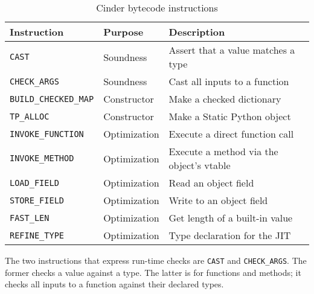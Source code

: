 \documentclass[english,cleveref,submission]{programming}
\newcommand{\SP}{Static Python}
\newcommand{\code}[1]{\texttt{#1}}
\newcommand{\bcinst}[1]{\code{#1}}
\begin{document}
\begin{table}
  \caption{Cinder bytecode instructions}
  \label{t:bytecode}

  \begin{tabular}{lll}
    {Instruction} & {Purpose} & {Description} \\\hline
    \bcinst{CAST} & Soundness & Assert that a value matches a type \\
    \bcinst{CHECK\_ARGS} & Soundness & Cast all inputs to a function \\[1ex]

    \bcinst{BUILD\_CHECKED\_MAP} & Constructor & Make a checked dictionary \\
    \bcinst{TP\_ALLOC} & Constructor & Make a \SP{} object \\[1ex]

    \bcinst{INVOKE\_FUNCTION} & Optimization & Execute a direct function call \\
    \bcinst{INVOKE\_METHOD} & Optimization & Execute a method via the object's vtable \\
    \bcinst{LOAD\_FIELD} & Optimization & Read an object field \\
    \bcinst{STORE\_FIELD} & Optimization & Write to an object field \\
    \bcinst{FAST\_LEN} & Optimization & Get length of a built-in value \\
    \bcinst{REFINE\_TYPE} & Optimization & Type declaration for the JIT \\


  \end{tabular}
\end{table}

The two instructions that express run-time checks are \code{CAST}
and \code{CHECK\_ARGS}.
The former checks a value against a type.
The latter is for functions and methods; it checks all inputs to a function
against their declared types.
\end{document}
